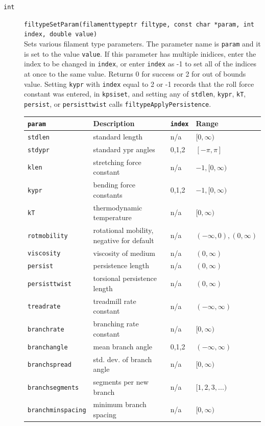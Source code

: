 \documentclass {scrbook}
\newcommand {\ttt} {\texttt}
\begin{document}
\begin{description}
\item[\ttt{int}]
\ttt{filtypeSetParam(filamenttypeptr filtype, const char *param, int index, double value)}
\hfill \\
Sets various filament type parameters. The parameter name is \ttt{param} and it is set to the value \ttt{value}. If this parameter has multiple inidices, enter the index to be changed in \ttt{index}, or enter \ttt{index} as -1 to set all of the indices at once to the same value. Returns 0 for success or 2 for out of bounds value. Setting \ttt{kypr} with \ttt{index} equal to 2 or -1 records that the roll force constant was entered, in \ttt{kpsiset}, and setting any of \ttt{stdlen}, \ttt{kypr}, \ttt{kT}, \ttt{persist}, or \ttt{persisttwist} calls \ttt{filtypeApplyPersistence}.

{\tiny
\begin{longtable}[c]{llll}
\ttt{param} & Description & \ttt{index} & Range\\
\hline
\ttt{stdlen} & standard length & n/a & $[0,\infty)$\\
\ttt{stdypr} & standard ypr angles & 0,1,2 & $[-\pi,\pi]$\\
\ttt{klen} & stretching force constant & n/a & $-1,[0,\infty)$\\
\ttt{kypr} & bending force constants & 0,1,2 & $-1,[0,\infty)$\\
\ttt{kT} & thermodynamic temperature & n/a & $[0,\infty)$\\
\ttt{rotmobility} & rotational mobility, negative for default & n/a & $(-\infty,0),(0,\infty)$\\
\ttt{viscosity} & viscosity of medium & n/a & $(0,\infty)$\\
\ttt{persist} & persistence length & n/a & $(0,\infty)$\\
\ttt{persisttwist} & torsional persistence length & n/a & $(0,\infty)$\\
\ttt{treadrate} & treadmill rate constant & n/a & $(-\infty,\infty)$\\
\ttt{branchrate} & branching rate constant & n/a & $[0,\infty)$\\
\ttt{branchangle} & mean branch angle & 0,1,2 & $(-\infty,\infty)$\\
\ttt{branchspread} & std. dev. of branch angle & n/a & $[0,\infty)$\\
\ttt{branchsegments} & segments per new branch & n/a & $[1,2,3,...)$ \\
\ttt{branchminspacing} & minimum branch spacing & n/a & $[0,\infty)$ \\

\end{longtable}}
\end{description}
\end{document}

